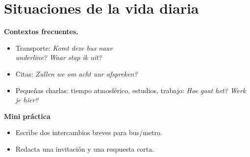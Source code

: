 \section{Situaciones de la vida diaria}
\textbf{Contextos frecuentes.}
\begin{itemize}[leftmargin=*]
  \item Transporte: \textit{Komt deze bus naar \\underline{\hspace{1.2cm}}?} \textit{Waar stap ik uit?}
  \item Citas: \textit{Zullen we om acht uur afspreken?}
  \item Pequeñas charlas: tiempo atmosférico, estudios, trabajo: \textit{Hoe gaat het? Werk je hier?}
\end{itemize}

\textbf{Mini práctica}
\begin{itemize}[leftmargin=*]
  \item Escribe dos intercambios breves para bus/metro.
  \item Redacta una invitación y una respuesta corta.
\end{itemize}
